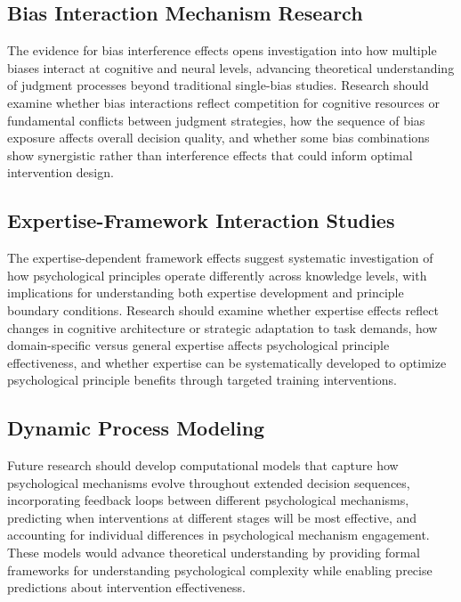 \documentclass[
  authoryear,
  preprint]{elsarticle}
\begin{document}
\subsection{Bias Interaction Mechanism
Research}\label{bias-interaction-mechanism-research}

The evidence for bias interference effects opens investigation into how
multiple biases interact at cognitive and neural levels, advancing
theoretical understanding of judgment processes beyond traditional
single-bias studies. Research should examine whether bias interactions
reflect competition for cognitive resources or fundamental conflicts
between judgment strategies, how the sequence of bias exposure affects
overall decision quality, and whether some bias combinations show
synergistic rather than interference effects that could inform optimal
intervention design.

\subsection{Expertise-Framework Interaction
Studies}\label{expertise-framework-interaction-studies}

The expertise-dependent framework effects suggest systematic
investigation of how psychological principles operate differently across
knowledge levels, with implications for understanding both expertise
development and principle boundary conditions. Research should examine
whether expertise effects reflect changes in cognitive architecture or
strategic adaptation to task demands, how domain-specific versus general
expertise affects psychological principle effectiveness, and whether
expertise can be systematically developed to optimize psychological
principle benefits through targeted training interventions.

\subsection{Dynamic Process Modeling}\label{dynamic-process-modeling}

Future research should develop computational models that capture how
psychological mechanisms evolve throughout extended decision sequences,
incorporating feedback loops between different psychological mechanisms,
predicting when interventions at different stages will be most
effective, and accounting for individual differences in psychological
mechanism engagement. These models would advance theoretical
understanding by providing formal frameworks for understanding
psychological complexity while enabling precise predictions about
intervention effectiveness.
\end{document}

